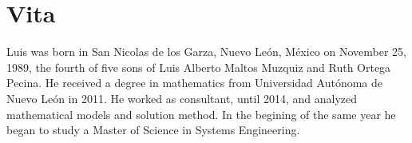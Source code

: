 \chapter{Vita}
Luis was born in San Nicolas de los Garza,
Nuevo León, México
on November 25, 1989,
the fourth of five sons of
Luis Alberto Maltos Muzquiz and Ruth Ortega Pecina.
He received a degree in mathematics
from Universidad Autónoma de Nuevo León in 2011.
He worked as consultant,
until 2014,
and analyzed mathematical models
and solution method.
In the begining of the same year
he began to study a Master of Science
in Systems Engineering.
